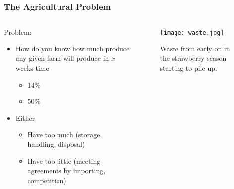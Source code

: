 \documentclass[aspectratio=169]{beamer}
\begin{document}
  \begin{frame}
    \frametitle{The Agricultural Problem}
    \begin{columns}
      \begin{column}{0.5\textwidth}
        Problem:
        \begin{itemize}
          \item How do you know how much produce any given farm will produce in $x$ weeks time
            \begin{itemize}
              \item 14\%
              \item 50\%
            \end{itemize}
          \item Either
            \begin{itemize}
              \item Have too much (storage, handling, disposal)
              \item Have too little (meeting agreements by importing, competition)
            \end{itemize}
        \end{itemize}
      \end{column}
      \begin{column}{0.5\textwidth}
        \begin{figure}[th!]
          \centering
          \texttt{[image: waste.jpg]}
          \caption{Waste from early on in the strawberry season starting to pile up. \autocite{repository}}
          \label{fig:gh}
        \end{figure}
      \end{column}
    \end{columns}
  \end{frame}
\end{document}
